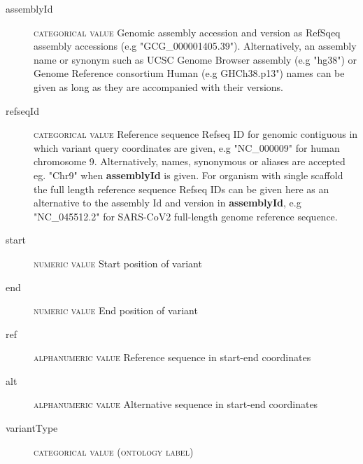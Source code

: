 \documentclass[a4paper, 10pt]{article}        %
\begin{document}
\begin{description}
	\item[assemblyId] {\textsc{categorical value}} Genomic assembly accession and version as RefSqeq assembly accessions (e.g "GCG\_000001405.39"). Alternatively, an assembly name or synonym such as UCSC Genome Browser assembly (e.g "hg38") or Genome Reference consortium Human (e.g GHCh38.p13") names can be given as long as they are accompanied with their versions. 
 	\item[refseqId] {\textsc{categorical value}} Reference sequence Refseq ID for genomic contiguous in which variant query coordinates are given, e.g "NC\_000009" for human chromosome 9. Alternatively, names, synonymous or aliases are accepted eg. "Chr9" when \textbf{assemblyId} is given. For organism with single scaffold the full length reference sequence Refseq IDs can be given here as an alternative to the assembly Id and version in \textbf{assemblyId}, e.g "NC\_045512.2" for SARS-CoV2 full-length genome reference sequence. 
	\item[start] {\textsc{numeric value}} Start position of variant
	\item[end] {\textsc{numeric value}} End position of variant %
	\item[ref] {\textsc{alphanumeric value}} Reference sequence in start-end coordinates
	\item[alt] {\textsc{alphanumeric value}} Alternative sequence in start-end coordinates
	\item[variantType] {\textsc{categorical value (ontology label)}}
 \end{description}
 
\end{document}
